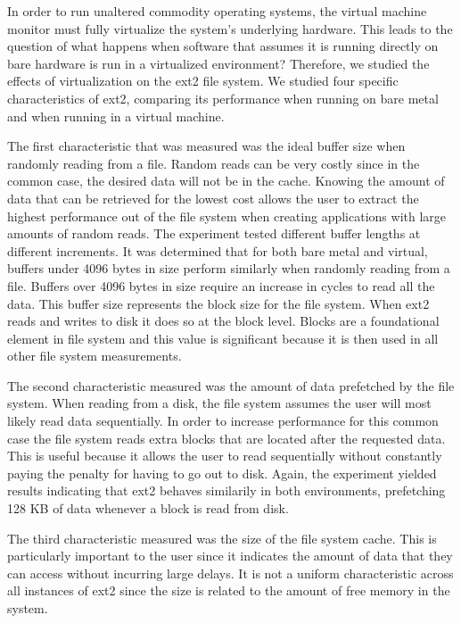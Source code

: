 \documentclass[letterpaper,twocolumn,10pt]{article}
\begin{document}
In order to run unaltered commodity operating systems, the virtual machine monitor must fully virtualize the system's underlying hardware.
This leads to the question of what happens when software that assumes it is running directly on bare hardware is run in a virtualized environment?
Therefore, we studied the effects of virtualization on the ext2 file system.
We studied four specific characteristics of ext2, comparing its performance when running on bare metal and when running in a virtual machine.

The first characteristic that was measured was the ideal buffer size when randomly reading from a file. 
Random reads can be very costly since in the common case, the desired data will not be in the cache. 
Knowing the amount of data that can be retrieved for the lowest cost allows the user to extract the highest performance out of the file system when creating applications with large amounts of random reads. 
The experiment tested different buffer lengths at different increments. 
It was determined that for both bare metal and virtual, buffers under 4096 bytes in size perform similarly when randomly reading from a file. 
Buffers over 4096 bytes in size require an increase in cycles to read all the data. 
This buffer size represents the block size for the file system. 
When ext2 reads and writes to disk it does so at the block level.
Blocks are a foundational element in file system and this value is significant because it is then used in all other file system measurements.

The second characteristic measured was the amount of data prefetched by the file system. 
When reading from a disk, the file system assumes the user will most likely read data sequentially. 
In order to increase performance for this common case the file system reads extra blocks that are located after the requested data. 
This is useful because it allows the user to read sequentially without constantly paying the penalty for having to go out to disk. 
Again, the experiment yielded results indicating that ext2 behaves similarily in both environments, prefetching 128 KB of data whenever a block is read from disk.

The third characteristic measured was the size of the file system cache. 
This is particularly important to the user since it indicates the amount of data that they can access without incurring large delays. 
It is not a uniform characteristic across all instances of ext2 since the size is related to the amount of free memory in the system. 
\end{document}
